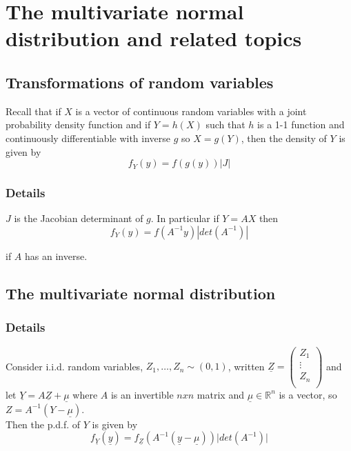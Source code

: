 \documentclass[12pt,a4paper]{article}
\theoremstyle{regla}
\theoremstyle{remark}
\theoremstyle{definition}
\theoremstyle{nonumberbreak}
\begin{document}
\section{The multivariate normal distribution and related topics}
\subsection{Transformations of random variables}
\begin{fbox}
\begin{minipage}{0.97\textwidth}
Recall that if $X$ is a vector of continuous random variables with a joint probability density function and if $Y=h(X)$ such that $h$ is a 1-1 function and continuously differentiable with inverse $g$ so $X= g(Y)$, then the density of $Y$ is given by 
$$ f_Y(y)=f(g(y))|J|$$
\end{minipage}
\end{fbox}
\subsubsection{Details}
$J$ is the Jacobian determinant of $g$. In particular if $Y=AX$ then 
$$ f_Y(y)=f(A^{-1}y)|det(A^{-1})|$$

if $A$ has an inverse.

\subsection{The multivariate normal distribution}
\subsubsection{Details}
Consider i.i.d. random variables, $Z_1, \ldots ,Z_n \sim (0,1)$, written $\underline{Z}=\left( \begin{array}{ccc}
   Z_1 \\
  \vdots\\
  Z_n\\
 \end{array} \right)$ and let $\underline{Y}=A \underline{Z} + \underline{\mu}$ where $A$ is an invertible $n x n$ matrix and $\underline{\mu} \in \mathbb{R}^n$ is a vector, so $ Z= A^{-1}(Y-\underline{\mu})$.\\

Then the p.d.f. of $Y$ is given by $$f_{\underline{Y}}(\underline{y})= f_{\underline{Z}}(A^{-1}(\underline{y}- \underline{\mu})) \vert det(A^{-1}) \vert$$
\end{document}
